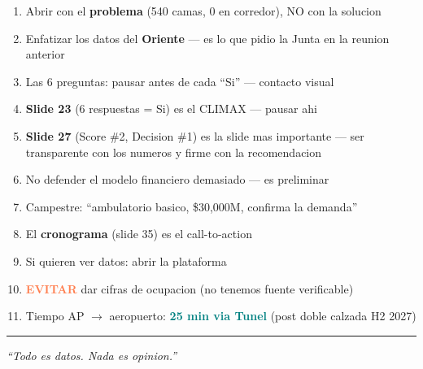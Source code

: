 \documentclass[10pt, a4paper]{article}
\newcommand{\hl}[1]{\textcolor{teal}{\textbf{#1}}}
\newcommand{\dg}[1]{\textcolor{coral}{\textbf{#1}}}
\begin{document}
\begin{enumerate}[leftmargin=*, itemsep=3pt]
  \item[$\square$] Abrir con el \textbf{problema} (540 camas, 0 en corredor), NO con la solucion
  \item[$\square$] Enfatizar los datos del \textbf{Oriente} --- es lo que pidio la Junta en la reunion anterior
  \item[$\square$] Las 6 preguntas: pausar antes de cada ``Si'' --- contacto visual
  \item[$\square$] \textbf{Slide 23} (6 respuestas = Si) es el CLIMAX --- pausar ahi
  \item[$\square$] \textbf{Slide 27} (Score \#2, Decision \#1) es la slide mas importante --- ser transparente con los numeros y firme con la recomendacion
  \item[$\square$] No defender el modelo financiero demasiado --- es preliminar
  \item[$\square$] Campestre: ``ambulatorio basico, \$30,000M, confirma la demanda''
  \item[$\square$] El \textbf{cronograma} (slide 35) es el call-to-action
  \item[$\square$] Si quieren ver datos: abrir la plataforma
  \item[$\square$] \dg{EVITAR} dar cifras de ocupacion (no tenemos fuente verificable)
  \item[$\square$] Tiempo AP $\to$ aeropuerto: \hl{25 min via Tunel} (post doble calzada H2 2027)
\end{enumerate}

\vfill
\begin{center}
{\color{hptu}\rule{0.6\textwidth}{0.8pt}}
\vspace{4pt}
{\small\color{slate}\textit{``Todo es datos. Nada es opinion.''}}
\end{center}
\end{document}
